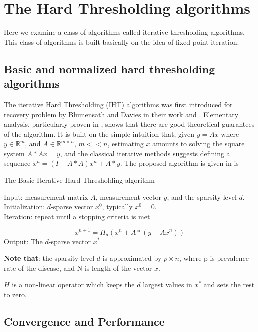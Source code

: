 \section{The Hard Thresholding algorithms}
Here we examine a class of algorithms called  iterative thresholding algorithms. This class of algorithms is built basically on the idea of fixed point iteration.  
\subsection{Basic and normalized hard thresholding algorithms}
  

The iterative Hard Thresholding (IHT) algorithms was first introduced for recovery problem by Blumensath and Davies in their work  \cite{bluemensath} and \cite{bluementh}. Elementary analysis, particularly proven in \cite{analysis}, shows that there are good theoretical guarantees of the algorithm. It is built on the simple intuition that, given $ y = Ax $ where $ y \in \mathbb{R}^m $, and $ A \in \mathbb{R}^{m\times n} $, $ m << n $, estimating $ x $ amounts to solving the square system $ A*Ax = y $, and the classical iterative methods suggests defining a sequence $ x^n  = (I - A*A)x^n + A*y$. The proposed algorithm is given in \cite{mathbook} is
\begin{algorithm}
\caption{The Basic Iterative Hard Thresholding algorithm}
Input: measurement matrix $ A $, measurement vector $ y $, and the sparsity level $ d $.\\ 
Initialization: $ d $-sparse vector $ x^0 $, typically $ x^0 = 0 $.\\ 
Iteration: repeat until a stopping criteria is met 

\begin{equation*}\label{key}
x^{n+1} = H_d(x^n+ A* (y - Ax^n))
\end{equation*}
Output: The $ d $-sparse vector $x^*$
\end{algorithm} 

\newpage
\textbf{Note that}: the sparsity level $ d $ is approximated by $ p \times n $, where p is prevalence rate of the disease, and N is length of the vector $ x $. 

$ H $ is a non-linear operator which keeps the $d$ largest values in $ x^* $ and sets the rest to zero. %

\subsection{Convergence and Performance}

